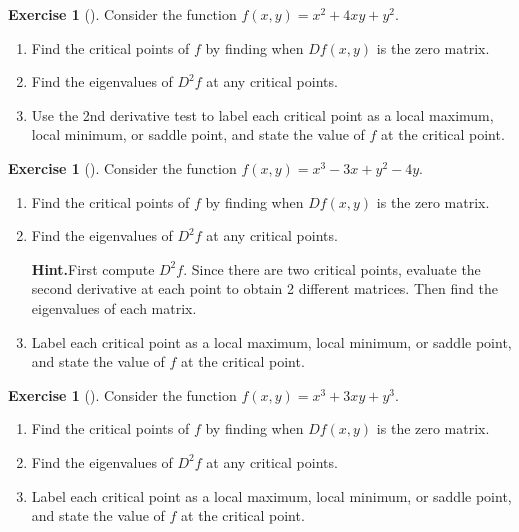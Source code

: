 \documentclass[10pt,]{book}
\theoremstyle{plain}
\theoremstyle{definition}
\theoremstyle{definition}
\theoremstyle{definition}
\theoremstyle{definition}
\newtheorem{exploration}[project]{Exercise}
\theoremstyle{definition}
\numberwithin{equation}{section}
\begin{document}
\begin{exploration}[]\label{exploration-234}
Consider the function \(f(x,y)=x^2+4xy+y^2\).%
\begin{enumerate}[font=\bfseries,label=(\alph*),ref=\alph*]
\item\label{task-638} Find the critical points of \(f\) by finding when \(Df(x,y)\) is the zero matrix.%
\item\label{task-639} Find the eigenvalues of \(D^2f\) at any critical points.%
\item\label{task-640} Use the 2nd derivative test to label each critical point as a local maximum, local minimum, or saddle point, and state the value of \(f\) at the critical point.%
\end{enumerate}
\end{exploration}
\begin{exploration}[]\label{exploration-235}
Consider the function \(f(x,y)=x^3-3x+y^2-4y\).%
\begin{enumerate}[font=\bfseries,label=(\alph*),ref=\alph*]
\item\label{task-641} Find the critical points of \(f\) by finding when \(Df(x,y)\) is the zero matrix.%
\item\label{task-642} Find the eigenvalues of \(D^2f\) at any critical points.%
\par\medskip\noindent%
\textbf{Hint.}\quad First compute \(D^2f\). Since there are two critical points, evaluate the second derivative at each point to obtain 2 different matrices. Then find the eigenvalues of each matrix.%
\item\label{task-643} Label each critical point as a local maximum, local minimum, or saddle point, and state the value of \(f\) at the critical point.%
\end{enumerate}
\end{exploration}
\begin{exploration}[]\label{exploration-236}
Consider the function \(f(x,y)=x^3 + 3xy +y^3\).%
\begin{enumerate}[font=\bfseries,label=(\alph*),ref=\alph*]
\item\label{task-644} Find the critical points of \(f\) by finding when \(Df(x,y)\) is the zero matrix.%
\item\label{task-645} Find the eigenvalues of \(D^2f\) at any critical points.%
\item\label{task-646} Label each critical point as a local maximum, local minimum, or saddle point, and state the value of \(f\) at the critical point.%
\end{enumerate}
\end{exploration}
\typeout{************************************************}
\typeout{************************************************}
\end{document}
